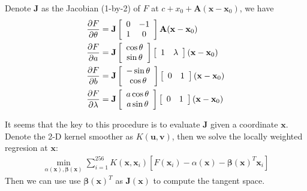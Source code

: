\begin{exercise}
  \begin{exerciseSection}
    Denote $\mathbf{J}$ as the Jacobian (1-by-2) of $F$ at
    $c+x_0+\mathbf{A}(\mathbf{x} - \mathbf{x}_0)$, we have
    \begin{subequations}
      \begin{align}
        \pdv{F}{\theta} & =\mathbf{J}\left[
          \begin{array}{cc}
            0 & -1 \\
            1 & 0
          \end{array}
        \right]\mathbf{A}(\mathbf{x} - \mathbf{x}_0) \\
        \pdv{F}{a} &= \mathbf{J}\left[
          \begin{array}{c}
            \cos\theta \\
            \sin\theta
          \end{array}
        \right]\left[
          \begin{array}{cc}
            1 & \lambda
          \end{array}
        \right](\mathbf{x} - \mathbf{x}_0) \\
        \pdv{F}{b} &= \mathbf{J}\left[
          \begin{array}{c}
            -\sin\theta \\
            \cos\theta
          \end{array}
        \right]\left[
          \begin{array}{cc}
            0 & 1
          \end{array}
        \right](\mathbf{x} - \mathbf{x}_0) \\
        \pdv{F}{\lambda} &= \mathbf{J}\left[
          \begin{array}{c}
            a\cos\theta \\
            a\sin\theta
          \end{array}
        \right]\left[
          \begin{array}{cc}
            0 & 1
          \end{array}
        \right](\mathbf{x} - \mathbf{x}_0)
      \end{align}
    \end{subequations}
  \end{exerciseSection}
  
  \begin{exerciseSection}
    It seems that the key to this procedure is to evaluate $\mathbf{J}$ given a
    coordinate $\mathbf{x}$. Denote the 2-D kernel smoother as $K(\mathbf{u},
    \mathbf{v})$, then we solve the locally weighted regresion at $\mathbf{x}$:
    \begin{align}
      \min_{\alpha(\mathbf{x}), \bm{\beta}(\mathbf{x})} \sum_{i = 1}^{256}
      K(\mathbf{x},\mathbf{x}_i)[F(\mathbf{x}_i)-
      \alpha(\mathbf{x})-\bm{\beta}(\mathbf{x})^T\mathbf{x}_i]
    \end{align}
    Then we can use use $\bm{\beta}(\mathbf{x})^T$ as $\mathbf{J}(\mathbf{x})$
    to compute the tangent space.
  \end{exerciseSection}
\end{exercise}

